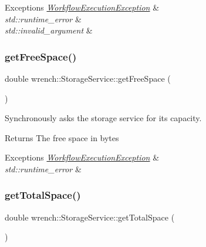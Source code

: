\begin{DoxyExceptions}{Exceptions}
{\em \hyperlink{classwrench_1_1_workflow_execution_exception}{Workflow\+Execution\+Exception}} & \\
\hline
{\em std\+::runtime\+\_\+error} & \\
\hline
{\em std\+::invalid\+\_\+argument} & \\
\hline
\end{DoxyExceptions}
\mbox{\label{classwrench_1_1_storage_service_a600a2fc0da8e1c5f1159509f09c2f2f6}} 
\subsubsection{\texorpdfstring{get\+Free\+Space()}{getFreeSpace()}}
{\footnotesize\ttfamily double wrench\+::\+Storage\+Service\+::get\+Free\+Space (\begin{DoxyParamCaption}{ }\end{DoxyParamCaption})\hspace{0.3cm}{\ttfamily [virtual]}}



Synchronously asks the storage service for its capacity. 

\begin{DoxyReturn}{Returns}
The free space in bytes
\end{DoxyReturn}

\begin{DoxyExceptions}{Exceptions}
{\em \hyperlink{classwrench_1_1_workflow_execution_exception}{Workflow\+Execution\+Exception}} & \\
\hline
{\em std\+::runtime\+\_\+error} & \\
\hline
\end{DoxyExceptions}
\mbox{\label{classwrench_1_1_storage_service_a0ea24bcd9b320bde776b64dd8e4cd494}} 
\subsubsection{\texorpdfstring{get\+Total\+Space()}{getTotalSpace()}}
{\footnotesize\ttfamily double wrench\+::\+Storage\+Service\+::get\+Total\+Space (\begin{DoxyParamCaption}{ }\end{DoxyParamCaption})}



